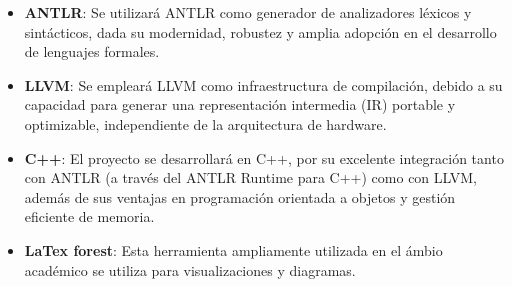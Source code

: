 \begin{itemize}
    \item \textbf{ANTLR}: Se utilizará ANTLR como generador de analizadores léxicos y sintácticos, dada su modernidad, robustez y amplia adopción en el desarrollo de lenguajes formales.

    \item \textbf{LLVM}: Se empleará LLVM como infraestructura de compilación, debido a su capacidad para generar una representación intermedia (IR) portable y optimizable, independiente de la arquitectura de hardware.

    \item \textbf{C++}: El proyecto se desarrollará en C++, por su excelente integración tanto con ANTLR (a través del ANTLR Runtime para C++) como con LLVM, además de sus ventajas en programación orientada a objetos y gestión eficiente de memoria.

    \item \textbf{LaTex forest}: Esta herramienta ampliamente utilizada en el ámbio académico se utiliza para visualizaciones y diagramas. 
\end{itemize}